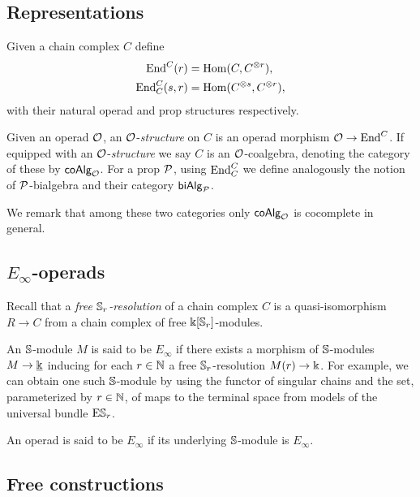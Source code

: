 \subsection{Representations}

Given a chain complex $C$ define
\begin{align*}
\End^C(r) &= \Hom(C, C^{\otimes r}), \\
\End^C_C(s, r) &= \Hom(C^{\otimes s}, C^{\otimes r}),
\end{align*}
with their natural operad and prop structures respectively.

Given an operad $\cO$, an $\cO$-\textit{structure} on $C$ is an operad morphism $\cO \to \End^C$.
If equipped with an $\cO$-\textit{structure} we say $C$ is an $\cO$-coalgebra, denoting the category of these by $\coAlg_\cO$.
For a prop $\cP$, using $\End_C^C$ we define analogously the notion of $\cP$-bialgebra and their category $\biAlg_\cP$.

We remark that among these two categories only $\coAlg_\cO$ is cocomplete in general.

\subsection{$E_{\infty}$-operads}

Recall that a \textit{free $\S_r$-resolution} of a chain complex $C$ is a quasi-isomorphism $R \to C$ from a chain complex of free $\k[\S_r]$-modules.

An $\S$-module $M$ is said to be $E_{\infty}$ if there exists a morphism of $\S$-modules $M \to \underline{\k}$ inducing for each $r \in \N$ a free $\S_r$-resolution $M(r) \to \k$.
For example, we can obtain one such $\S$-module by using the functor of singular chains and the set, parameterized by $r \in \N$, of maps to the terminal space from models of the universal bundle $\mathrm{E} \S_r$.

An operad is said to be $E_{\infty}$ if its underlying $\S$-module is $E_\infty$.

\subsection{Free constructions} \label{ss:free constructions}

